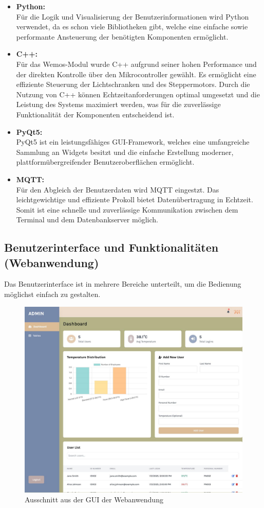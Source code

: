 \begin{itemize}
    \item \textbf{Python:}\\
    Für die Logik und Visualisierung der Benutzerinformationen wird Python verwendet, da es schon viele Bibliotheken gibt, welche eine einfache sowie performante Ansteuerung der benötigten Komponenten ermöglicht.
    \item \textbf{C++:}\\
    Für das Wemos-Modul wurde C++ aufgrund seiner hohen Performance und der direkten Kontrolle über den Mikrocontroller gewählt. Es ermöglicht eine effiziente Steuerung der Lichtschranken und des Steppermotors. Durch die Nutzung von C++ können Echtzeitanforderungen optimal umgesetzt und die Leistung des Systems maximiert werden, was für die zuverlässige Funktionalität der Komponenten entscheidend ist.
    \item \textbf{PyQt5:}\\
    PyQt5 ist ein leistungsfähiges GUI-Framework, welches eine umfangreiche Sammlung an Widgets besitzt und die einfache Erstellung moderner, plattformübergreifender Benutzeroberflächen ermöglicht.
    \item \textbf{MQTT:}\\
    Für den Abgleich der Benutzerdaten wird MQTT eingestzt. Das leichtgewichtige und effiziente Prokoll bietet Datenübertragung in Echtzeit. Somit ist eine schnelle und zuverlässige Kommunikation zwischen dem Terminal und dem Datenbankserver möglich. 
\end{itemize}

\subsection{Benutzerinterface und Funktionalitäten (Webanwendung)}

Das Benutzerinterface ist in mehrere Bereiche unterteilt, um die Bedienung möglichst einfach zu gestalten. 

\begin{figure}[h]
	\centering
	\includegraphics[width=0.4\linewidth]{figures/GUI.jpeg}
	\caption[GUI]{Ausschnitt aus der GUI der Webanwendung}\label{fig:gui}
\end{figure}

